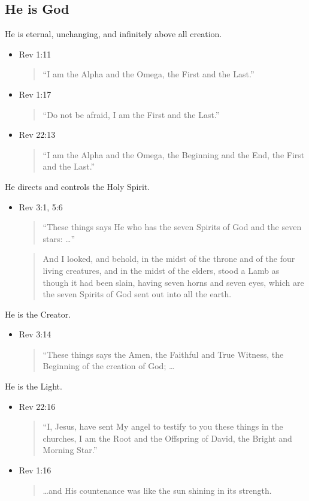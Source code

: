 \documentclass[12pt]{article}
\newcommand{\BI}{\begin{itemize}}
\newcommand{\EI}{\end{itemize}}
\newcommand{\I}{\item}
\newcommand{\Q}[1]{\begin{quote} #1 \end{quote}}
\begin{document}
\subsection{He is God}
\I He is eternal, unchanging, and infinitely above all creation.
\BI \I Rev 1:11 \Q{``I am the Alpha and the Omega, the First and the Last.''}
    \I Rev 1:17 \Q{``Do not be afraid, I am the First and the Last.''}
    \I Rev 22:13 \Q{``I am the Alpha and the Omega, the Beginning and the End, 
                    the First and the Last.''} \EI
\I He directs and controls the Holy Spirit.
\BI \I Rev 3:1, 5:6
            \Q{``These things says He who has the seven Spirits of God 
                and the seven stars: \ldots''}    
            \Q{And I looked, and behold, in the midst of the throne 
                and of the four living creatures, 
                and in the midst of the elders, 
                stood a Lamb as though it had been slain, 
                having seven horns and seven eyes, 
                which are the seven Spirits of God sent out into all the earth.}
\EI
\I He is the Creator.
\BI \I Rev 3:14 \Q{``These things says the Amen, the Faithful and True Witness,
                    the Beginning of the creation of God; \ldots} \EI
\I He is the Light.
\BI \I Rev 22:16 \Q{``I, Jesus, have sent My angel to testify to you these 
                things in the churches, I am the Root and the Offspring of 
                David, the Bright and Morning Star.''}
    \I Rev 1:16 \Q{\dots and His countenance was like the sun shining 
                    in its strength.} \EI
\end{document}
